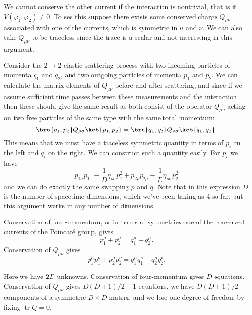 \documentclass[fleqn]{NotesClass}
\newcommand{\minkowskiMetric}{\eta}
\DeclareMathOperator{\tr}{tr}
\begin{document}
    We cannot conserve the other current if the interaction is nontrivial, that is if \(V(\varphi_1, \varphi_2) \ne 0\).
    To see this suppose there exists some conserved charge \(Q_{\mu\nu}\) associated with one of the currents, which is symmetric in \(\mu\) and \(\nu\).
    We can also take \(Q_{\mu\nu}\) to be traceless since the trace is a scalar and not interesting in this argument.
    
    Consider the \(2 \to 2\) elastic scattering process with two incoming particles of momenta \(q_1\) and \(q_2\), and two outgoing particles of momenta \(p_1\) and \(p_2\).
    We can calculate the matrix elements of \(Q_{\mu\nu}\) before and after scattering, and since if we assume sufficient time passes between these measurements and the interaction then these should give the same result as both consist of the operator \(Q_{\mu\nu}\) acting on two free particles of the same type with the same total momentum:
    \begin{equation}
        \bra{p_1, p_2} Q_{\rho\sigma} \ket{p_1, p_2} = \bra{q_1, q_2} Q_{\rho\sigma} \ket{q_1, q_2}.
    \end{equation}
    This means that we must have a traceless symmetric quantity in terms of \(p_i\) on the left and \(q_i\) on the right.
    We can construct such a quantity easily.
    For \(p_i\) we have
    \begin{equation}
        p_{1\sigma}p_{1\sigma} - \frac{1}{D}\minkowskiMetric_{\rho\sigma} p_1^2 + p_{2\rho}p_{2\rho} - \frac{1}{D}\minkowskiMetric_{\rho\sigma}p_2^2
    \end{equation}
    and we can do exactly the same swapping \(p\) and \(q\).
    Note that in this expression \(D\) is the number of spacetime dimensions, which we've been taking as 4 so far, but this argument works in any number of dimensions.
    
    Conservation of four-momentum, or in terms of symmetries one of the conserved currents of the Poincar\'e group, gives
    \begin{equation}
        p_1^\mu + p_2^\mu = q_1^\mu + q_2^\mu.
    \end{equation}
    Conservation of \(Q_{\mu\nu}\) gives
    \begin{equation}
        p_1^\mu p_1^\nu + p_2^\mu p_2^\nu = q_1^\mu q_1^\nu + q_2^\mu q_2^\nu.
    \end{equation}
    
    Here we have \(2D\) unknowns.
    Conservation of four-momentum gives \(D\) equations.
    Conservation of \(Q_{\mu\nu}\) gives \(D(D + 1)/2 - 1\) equations, we have \(D(D + 1)/2\) components of a symmetric \(D \times D\) matrix, and we lose one degree of freedom by fixing \(\tr Q = 0\).
    
\end{document}
